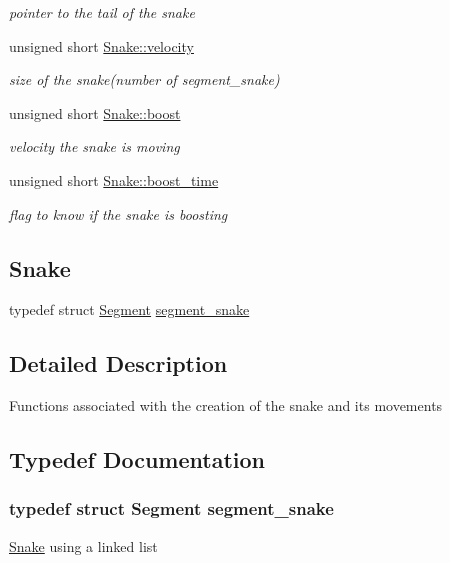 \begin{DoxyCompactItemize}
\begin{DoxyCompactList}\small\item\em pointer to the tail of the snake \end{DoxyCompactList}\item 
unsigned short \hyperlink{group__snake_gac444a5a9306233f5be0b603335785b3d}{Snake\+::velocity}
\begin{DoxyCompactList}\small\item\em size of the snake(number of segment\+\_\+snake) \end{DoxyCompactList}\item 
unsigned short \hyperlink{group__snake_ga7339bbc2027ffeb1ce00f24a834610cc}{Snake\+::boost}
\begin{DoxyCompactList}\small\item\em velocity the snake is moving \end{DoxyCompactList}\item 
unsigned short \hyperlink{group__snake_ga0b46bc6b402fd8999c6998eca1806c3e}{Snake\+::boost\+\_\+time}
\begin{DoxyCompactList}\small\item\em flag to know if the snake is boosting \end{DoxyCompactList}\end{DoxyCompactItemize}
\subsection*{Snake}
\begin{DoxyCompactItemize}
\item 
typedef struct \hyperlink{structSegment}{Segment} \hyperlink{group__snake_ga40f634d31a1f9372bd182d65da207a21}{segment\+\_\+snake}
\end{DoxyCompactItemize}


\subsection{Detailed Description}
Functions associated with the creation of the snake and its movements 

\subsection{Typedef Documentation}
\subsubsection[{\texorpdfstring{segment\+\_\+snake}{segment_snake}}]{\setlength{\rightskip}{0pt plus 5cm}typedef struct {\bf Segment} {\bf segment\+\_\+snake}}\hypertarget{group__snake_ga40f634d31a1f9372bd182d65da207a21}{}\label{group__snake_ga40f634d31a1f9372bd182d65da207a21}
\hyperlink{structSnake}{Snake} using a linked list 

